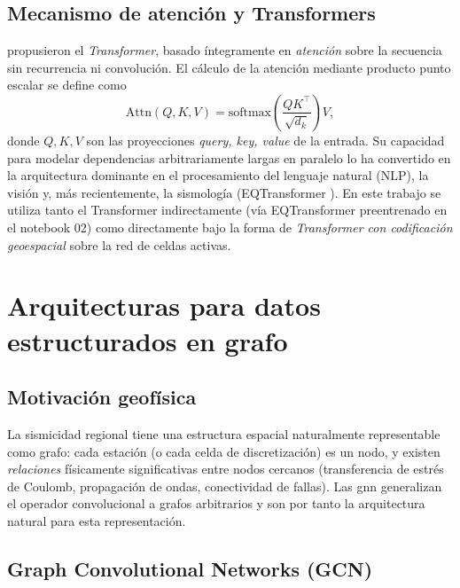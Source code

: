 \subsection{Mecanismo de atención y Transformers}

\citet{vaswani2017attention} propusieron el \emph{Transformer}, basado íntegramente en \emph{atención} sobre la secuencia sin recurrencia ni convolución. El cálculo de la atención mediante producto punto escalar se define como
\begin{equation}
  \mathrm{Attn}(Q, K, V) = \mathrm{softmax}\!\left(\frac{QK^\top}{\sqrt{d_k}}\right) V,
  \label{eq:attention}
\end{equation}
donde $Q, K, V$ son las proyecciones \emph{query, key, value} de la entrada. Su capacidad para modelar dependencias arbitrariamente largas en paralelo lo ha convertido en la arquitectura dominante en el procesamiento del lenguaje natural (NLP), la visión y, más recientemente, la sismología (EQTransformer \citep{mousavi2020eqtransformer}). En este trabajo se utiliza tanto el Transformer indirectamente (vía EQTransformer preentrenado en el notebook 02) como directamente bajo la forma de \emph{Transformer con codificación geoespacial} sobre la red de celdas activas.

\section{Arquitecturas para datos estructurados en grafo}
\label{dl-grafos}

\subsection{Motivación geofísica}

La sismicidad regional tiene una estructura espacial naturalmente representable como grafo: cada estación (o cada celda de discretización) es un nodo, y existen \emph{relaciones} físicamente significativas entre nodos cercanos (transferencia de estrés de Coulomb, propagación de ondas, conectividad de fallas). Las \gls{gnn} \citep{scarselli2009gnn} generalizan el operador convolucional a grafos arbitrarios y son por tanto la arquitectura natural para esta representación.

\subsection{Graph Convolutional Networks (GCN)}
\label{gcn-marco}

